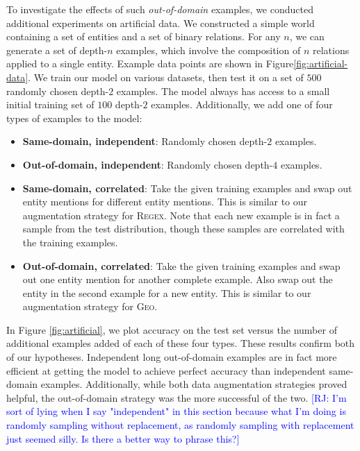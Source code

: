 \documentclass[11pt,letterpaper]{article}
\newcommand{\regex}{\textsc{Regex}\xspace}
\newcommand{\geo}{\textsc{Geo}\xspace}
\newcommand\rj[1]{\textcolor{blue}{[RJ: #1]}}
\begin{document}
To investigate the effects of such \emph{out-of-domain} examples,
we conducted additional experiments on artificial data.
We constructed a simple world containing a set of entities
and a set of binary relations.
For any $n$, we can generate a set of depth-$n$ examples,
which involve the composition of $n$ relations
applied to a single entity.
Example data points are shown in Figure\ref{fig:artificial-data}.
We train our model on various datasets,
then test it on a set of $500$ randomly chosen depth-$2$ examples.
The model always has access to a small initial training set of $100$ depth-$2$ examples.
Additionally, we add one of four types of examples to the model:
\begin{itemize}
  \item \textbf{Same-domain, independent}: Randomly chosen depth-$2$ examples.
  \item \textbf{Out-of-domain, independent}: Randomly chosen depth-$4$ examples.
  \item \textbf{Same-domain, correlated}: Take the given training examples
    and swap out entity mentions for different entity mentions.
    This is similar to our augmentation strategy for \regex.
    Note that each new example is in fact a sample from the test distribution,
    though these samples are correlated with the training examples.
  \item \textbf{Out-of-domain, correlated}: Take the given training examples
    and swap out one entity mention for another complete example.
    Also swap out the entity in the second example for a new entity.
    This is similar to our augmentation strategy for \geo.
\end{itemize}
In Figure \ref{fig:artificial}, we plot accuracy on the test set 
versus the number of additional examples added of each of these four types.
These results confirm both of our hypotheses.  
Independent long out-of-domain examples are in fact more efficient
at getting the model to achieve perfect accuracy than independent same-domain examples.
Additionally, while both data augmentation strategies proved helpful,
the out-of-domain strategy was the more successful of the two.
\rj{I'm sort of lying when I say "independent" in this section because
  what I'm doing is randomly sampling without replacement,
  as randomly sampling with replacement just seemed silly.
Is there a better way to phrase this?}
\end{document}
